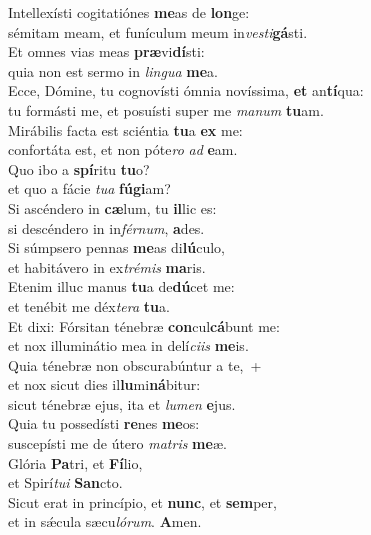 \evenverse Intellexísti cogitatiónes \textbf{me}as de \textbf{lon}ge:~\*\\
\evenverse sémitam meam, et funículum meum in\textit{ve}\textit{sti}\textbf{gá}sti.\\
\oddverse Et omnes vias meas \textbf{præ}vi\textbf{dí}sti:~\*\\
\oddverse quia non est sermo in \textit{lin}\textit{gua} \textbf{me}a.\\
\evenverse Ecce, Dómine, tu cognovísti ómnia novíssima, \textbf{et} an\textbf{tí}qua:~\*\\
\evenverse tu formásti me, et posuísti super me \textit{ma}\textit{num} \textbf{tu}am.\\
\oddverse Mirábilis facta est sciéntia \textbf{tu}a \textbf{ex} me:~\*\\
\oddverse confortáta est, et non póte\textit{ro} \textit{ad} \textbf{e}am.\\
\evenverse Quo ibo a \textbf{spí}ritu \textbf{tu}o?~\*\\
\evenverse et quo a fácie \textit{tu}\textit{a} \textbf{fú}\textbf{gi}am?\\
\oddverse Si ascéndero in \textbf{cæ}lum, tu \textbf{il}lic es:~\*\\
\oddverse si descéndero in in\textit{fér}\textit{num}, \textbf{a}des.\\
\evenverse Si súmpsero pennas \textbf{me}as di\textbf{lú}culo,~\*\\
\evenverse et habitávero in ex\textit{tré}\textit{mis} \textbf{ma}ris.\\
\oddverse Etenim illuc manus \textbf{tu}a de\textbf{dú}cet me:~\*\\
\oddverse et tenébit me déx\textit{te}\textit{ra} \textbf{tu}a.\\
\evenverse Et dixi: Fórsitan ténebræ \textbf{con}cul\textbf{cá}bunt me:~\*\\
\evenverse et nox illuminátio mea in delí\textit{ci}\textit{is} \textbf{me}is.\\
\oddverse Quia ténebræ non obscurabúntur a te,~+\\
\oddverse  et nox sicut dies il\textbf{lu}mi\textbf{ná}bitur:~\*\\
\oddverse sicut ténebræ ejus, ita et \textit{lu}\textit{men} \textbf{e}jus.\\
\evenverse Quia tu possedísti \textbf{re}nes \textbf{me}os:~\*\\
\evenverse suscepísti me de útero \textit{ma}\textit{tris} \textbf{me}æ.\\
\oddverse Glória \textbf{Pa}tri, et \textbf{Fí}lio,~\*\\
\oddverse et Spirí\textit{tu}\textit{i} \textbf{San}cto.\\
\evenverse Sicut erat in princípio, et \textbf{nunc}, et \textbf{sem}per,~\*\\
\evenverse et in sǽcula sæcu\textit{ló}\textit{rum}. \textbf{A}men.\\
